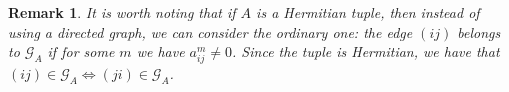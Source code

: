 \documentclass[draft, 12pt, reqno]{amsart}
\numberwithin{equation}{section}
\theoremstyle{plain}
\newtheorem{corollary}[theorem]{Corollary}
\newtheorem{remark}[theorem]{Remark}
\begin{document}

\begin{remark}
\normalfont It is worth noting that if $A$ is a Hermitian tuple, then instead of using a directed graph, we can consider the ordinary one: the edge $(ij)$ belongs to $\mathcal{G}_A$ if for some $m$ we have $a^m_{ij}\neq 0$. Since the tuple is Hermitian, we have that $(ij)\in \mathcal{G}_A \Longleftrightarrow (ji)\in \mathcal{G}_A$.	
\end{remark}

\end{document}
